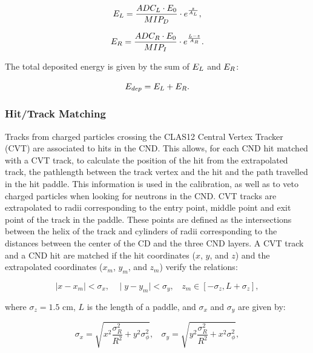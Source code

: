 \documentclass{elsart}
\begin{document}
\begin{equation}
E_{\rm{L}}=\frac{ADC_{\rm{L}} \cdot E_0}{MIP_{\rm{D}}}\cdot e^{\frac{z}{A_{\rm{L}}}},
\end{equation}

\begin{equation}
E_{\rm{R}}=\frac{ADC_{\rm{R}} \cdot E_0}{MIP_{\rm{I}}}\cdot e^{\frac{L-z}{A_{\rm{R}}}}.
\end{equation}

\noindent
The total deposited energy is given by the sum of $E_{\rm{L}}$ and $E_{\rm{R}}$:

\begin{equation}
E_{\rm{dep}}=E_{\rm{L}}+E_{\rm{R}}.
\end{equation}

\subsubsection{Hit/Track Matching}

Tracks from charged particles crossing the CLAS12 Central Vertex Tracker (CVT) are associated to hits in
the CND. This allows, for each CND hit matched with a CVT track, to calculate the position of the hit from the
extrapolated track, the pathlength between the track vertex and the hit and the path travelled in the hit
paddle. This information is used in the calibration, as well as to veto charged particles when looking for neutrons
in the CND. CVT tracks are extrapolated to radii corresponding to the entry point, middle point and exit point of
the track in the paddle. These points are defined as the intersections between the helix of the track and cylinders
of radii corresponding to the distances between the center of the CD and the three CND layers. A CVT track and
a CND hit are matched if the hit coordinates ($x$, $y$, and $z$) and the extrapolated coordinates ($x_{m}$,
$y_{m}$, and $z_{m}$) verify the relations:

\begin{equation}
\mid x-x_{m} \mid < \sigma_x ,~~~~\mid y-y_{m} \mid < \sigma_y , ~~~~z_{m}  \in [-\sigma_z,L+\sigma_z],
\end{equation}

\noindent
where $\sigma_z=1.5$ cm, $ L$ is the length of a paddle, and $\sigma_x$ and $\sigma_y$ are given by:

\begin{equation}
\sigma_x= \sqrt{x^{2}\frac{\sigma_{R}^{2}}{R^2}+y^{2}\sigma_{\phi}^{2}},~~~~
\sigma_y= \sqrt{y^{2}\frac{\sigma_{R}^{2}}{R^2}+x^{2}\sigma_{\phi}^{2}},
\end{equation}
\end{document}
